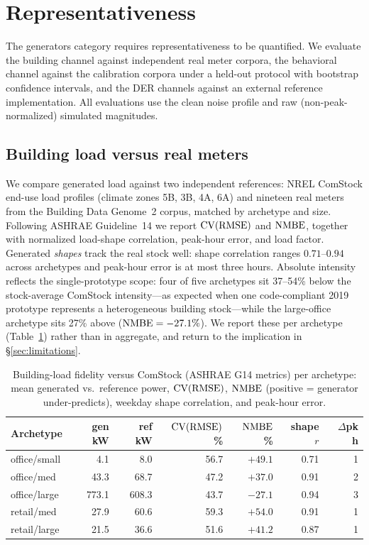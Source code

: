 \section{Representativeness}
\label{sec:representativeness}

The generators category requires representativeness to be quantified. We
evaluate the building channel against independent real meter corpora, the
behavioral channel against the calibration corpora under a held-out protocol
with bootstrap confidence intervals, and the DER channels against an external
reference implementation. All evaluations use the clean noise profile and raw
(non-peak-normalized) simulated magnitudes.

\subsection{Building load versus real meters}
\label{sec:loadfidelity}

We compare generated load against two independent references: NREL ComStock
end-use load profiles (climate zones 5B, 3B, 4A, 6A) and nineteen real meters
from the Building Data Genome~2 corpus, matched by archetype and size.
Following ASHRAE Guideline~14 we report $\mathrm{CV(RMSE)}{}$ and $\mathrm{NMBE}{}$, together
with normalized load-shape correlation, peak-hour error, and load factor.
Generated \emph{shapes} track the real stock well: shape correlation ranges
$0.71$--$0.94$ across archetypes and peak-hour error is at most three hours.
Absolute intensity reflects the single-prototype scope: four of five
archetypes sit 37--54\% below the stock-average ComStock intensity---as
expected when one code-compliant 2019 prototype represents a heterogeneous
building stock---while the large-office archetype sits 27\% above
($\mathrm{NMBE}{} = -27.1\%$). We report these per archetype (Table~\ref{tab:g14})
rather than in aggregate, and return to the implication in
\S\ref{sec:limitations}.

\begin{table}[t]
\caption{Building-load fidelity versus ComStock (ASHRAE G14 metrics) per
archetype: mean generated vs.\ reference power, $\mathrm{CV(RMSE)}{}$, $\mathrm{NMBE}{}$
(positive = generator under-predicts), weekday shape correlation, and
peak-hour error.}
\label{tab:g14}
\centering\small
\begin{tabular}{@{}lrrrrrr@{}}
\toprule
Archetype & gen kW & ref kW & $\mathrm{CV(RMSE)}{}$\% & $\mathrm{NMBE}{}$\% & shape $r$ & $\Delta$pk h \\
\midrule
office/small & 4.1 & 8.0 & 56.7 & $+49.1$ & 0.71 & 1 \\
office/med & 43.3 & 68.7 & 47.2 & $+37.0$ & 0.91 & 2 \\
office/large & 773.1 & 608.3 & 43.7 & $-27.1$ & 0.94 & 3 \\
retail/med & 27.9 & 60.6 & 59.3 & $+54.0$ & 0.91 & 1 \\
retail/large & 21.5 & 36.6 & 51.6 & $+41.2$ & 0.87 & 1 \\
\bottomrule
\end{tabular}
\end{table}

